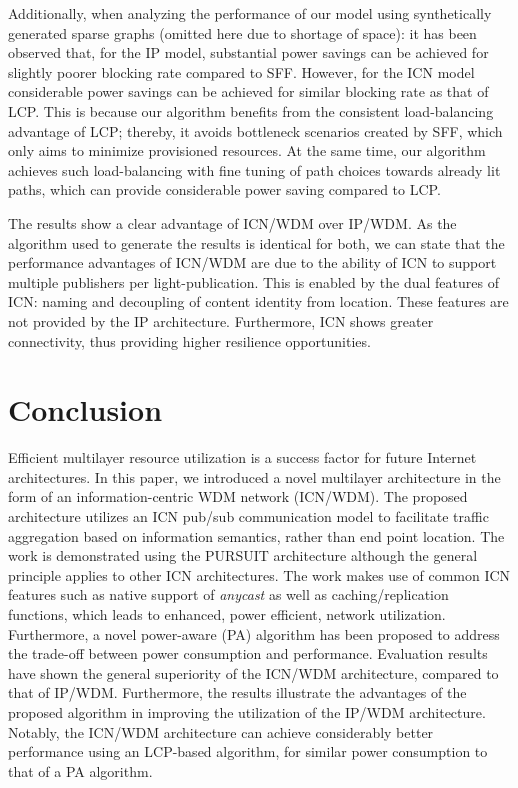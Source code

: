 \documentclass[journal]{IEEEtran}
\begin{document}
 Additionally, when analyzing the performance of our model using
 synthetically generated sparse graphs (omitted here due to shortage
 of space): it has been observed that, for the IP model, substantial
 power savings can be achieved for slightly poorer blocking rate
 compared to SFF. However, for the ICN model considerable power
 savings can be achieved for similar blocking rate as that of
 LCP. This is because our algorithm benefits from the consistent
 load-balancing advantage of LCP; thereby, it avoids bottleneck
 scenarios created by SFF, which only aims to minimize provisioned
 resources. At the same time, our algorithm achieves such
 load-balancing with fine tuning of path choices towards already lit
 paths, which can provide considerable power saving compared to LCP.

 The results show a clear advantage of ICN/WDM over IP/WDM. As
 the algorithm used to generate the results is identical for both, we can state that the performance advantages of
 ICN/WDM are due to the ability of ICN to support multiple
 publishers per light-publication. This is enabled by the dual features of ICN:
 naming and decoupling of content identity from location. These
 features are not provided by the IP architecture. Furthermore, ICN shows greater connectivity, thus
 providing higher resilience opportunities.
 
\section{Conclusion}\label{sec:con}
Efficient multilayer resource utilization is a success factor for future Internet architectures. In this paper, we introduced a novel multilayer architecture in the form of an information-centric WDM network (ICN/WDM). The proposed architecture utilizes an ICN pub/sub communication model to facilitate traffic aggregation based on information semantics, rather than end point location. The work is demonstrated using the PURSUIT architecture although the general principle applies to other ICN architectures. The work makes use of common ICN features such as native support of \emph{anycast} as well as caching/replication functions, which leads to enhanced, power efficient, network utilization. Furthermore, a novel power-aware (PA) algorithm has been proposed to address the trade-off between power consumption and performance. Evaluation results have shown the general superiority of the ICN/WDM architecture, compared to that of IP/WDM. Furthermore, the results illustrate the advantages of the proposed algorithm in improving the utilization of the IP/WDM architecture.
Notably, the ICN/WDM architecture can achieve considerably better performance using an LCP-based algorithm, for similar power consumption to that of a PA algorithm. 
\end{document}
